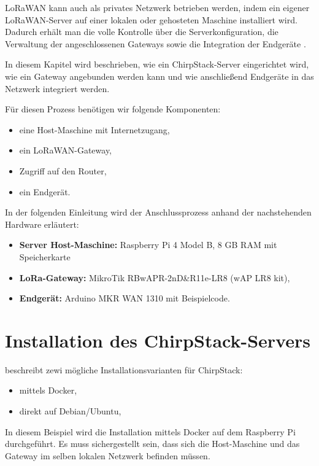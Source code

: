 	LoRaWAN kann auch als privates Netzwerk betrieben werden, indem ein eigener LoRaWAN-Server auf einer lokalen oder gehosteten Maschine installiert wird. Dadurch erhält man die volle Kontrolle über die Serverkonfiguration, die Verwaltung der angeschlossenen Gateways sowie die Integration der Endgeräte \cite{ChirpStack:2022b} \cite{Montagny:2022}.

	In diesem Kapitel wird beschrieben, wie ein ChirpStack-Server eingerichtet wird, wie ein Gateway angebunden werden kann und wie anschlie{\ss}end Endgeräte in das Netzwerk integriert werden.

	Für diesen Prozess benötigen wir folgende Komponenten:
	\begin{itemize}
		\item eine Host-Maschine mit Internetzugang,
		\item ein LoRaWAN-Gateway,
		\item Zugriff auf den Router,
		\item ein Endgerät.
	\end{itemize}
	
	In der folgenden Einleitung wird der Anschlussprozess anhand der nachstehenden Hardware erläutert:
	\begin{itemize}
		\item \textbf{Server Host-Maschine:} Raspberry Pi 4 Model B, 8 GB RAM mit Speicherkarte
		\item \textbf{LoRa-Gateway:} MikroTik RBwAPR-2nD\&R11e-LR8 (wAP LR8 kit),
		\item \textbf{Endgerät:} Arduino MKR WAN 1310 mit Beispielcode.
	\end{itemize}
	
	\vspace{0.3cm}
	
\section{Installation des ChirpStack-Servers}
	
	\textcite{ChirpStack:2022b} beschreibt zewi mögliche Installationsvarianten für ChirpStack:
	\begin{itemize}
		\item mittels Docker,
		\item direkt auf Debian/Ubuntu,
	\end{itemize}
	
	In diesem Beispiel wird die Installation mittels Docker auf dem Raspberry Pi durchgeführt. Es muss sichergestellt sein, dass sich die Host-Maschine und das Gateway im selben lokalen Netzwerk befinden müssen.
	
